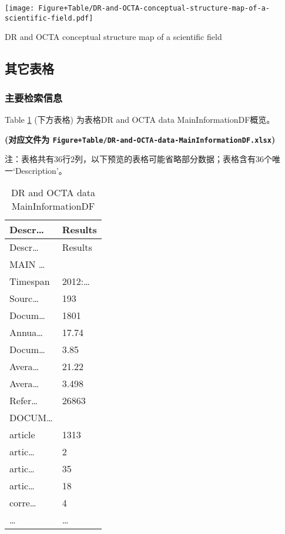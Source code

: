 \documentclass[
]{article}
\begin{document}
\def\@captype{figure}
\begin{center}
\texttt{[image: Figure+Table/DR-and-OCTA-conceptual-structure-map-of-a-scientific-field.pdf]}
\caption{DR and OCTA conceptual structure map of a scientific field}\label{fig:DR-and-OCTA-conceptual-structure-map-of-a-scientific-field}
\end{center}

\hypertarget{extra}{%
\subsection{其它表格}\label{extra}}

\hypertarget{ux4e3bux8981ux68c0ux7d22ux4fe1ux606f}{%
\subsubsection{主要检索信息}\label{ux4e3bux8981ux68c0ux7d22ux4fe1ux606f}}

Table \ref{tab:DR-and-OCTA-data-MainInformationDF} (下方表格) 为表格DR and OCTA data MainInformationDF概览。

\textbf{(对应文件为 \texttt{Figure+Table/DR-and-OCTA-data-MainInformationDF.xlsx})}

\begin{center}\begin{tcolorbox}[colback=gray!10, colframe=gray!50, width=0.9\linewidth, arc=1mm, boxrule=0.5pt]注：表格共有36行2列，以下预览的表格可能省略部分数据；表格含有36个唯一`Description'。
\end{tcolorbox}
\end{center}

\begin{longtable}[]{@{}ll@{}}
\caption{\label{tab:DR-and-OCTA-data-MainInformationDF}DR and OCTA data MainInformationDF}\tabularnewline
\toprule
Descr\ldots{} & Results\tabularnewline
\midrule
\endfirsthead
\toprule
Descr\ldots{} & Results\tabularnewline
\midrule
\endhead
MAIN \ldots{} &\tabularnewline
Timespan & 2012:\ldots{}\tabularnewline
Sourc\ldots{} & 193\tabularnewline
Docum\ldots{} & 1801\tabularnewline
Annua\ldots{} & 17.74\tabularnewline
Docum\ldots{} & 3.85\tabularnewline
Avera\ldots{} & 21.22\tabularnewline
Avera\ldots{} & 3.498\tabularnewline
Refer\ldots{} & 26863\tabularnewline
DOCUM\ldots{} &\tabularnewline
article & 1313\tabularnewline
artic\ldots{} & 2\tabularnewline
artic\ldots{} & 35\tabularnewline
artic\ldots{} & 18\tabularnewline
corre\ldots{} & 4\tabularnewline
\ldots{} & \ldots{}\tabularnewline
\bottomrule
\end{longtable}
\end{document}
